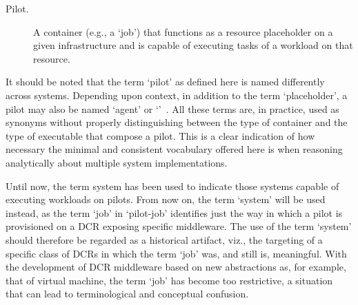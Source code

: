 \documentclass{sig-alternate}
\begin{document}

\begin{description}

\item[Pilot.] A container (e.g., a `job') that functions as a resource
placeholder on a given infrastructure and is capable of executing tasks of a
workload on that resource.

\end{description}

It should be noted that the term `pilot' as defined here is named differently
across \pilotjob systems. Depending upon context, in addition to the term
`placeholder', a pilot may also be named `agent' or
`\pilotjob'~\cite{moscicki2011,pinchak2002}. All these terms are, in practice,
used as synonyms without properly distinguishing between the type of container
and the type of executable that compose a pilot. This is a clear indication of
how necessary the minimal and consistent vocabulary offered here is when
reasoning analytically about multiple \pilotjob system implementations.

Until now, the term \pilotjob system has been used to indicate those systems
capable of executing workloads on pilots. From now on, the term `\pilot system'
will be used instead, as the term `job' in `pilot-job' identifies just the way
in which a pilot is provisioned on a DCR exposing specific middleware.
The use of the term `\pilotjob system' should therefore be regarded as a
historical artifact, viz., the targeting of a specific class of DCRs in which
the term `job' was, and still is, meaningful. With the development of DCR
middleware based on new abstractions as, for example, that of virtual machine,
the term `job' has become too restrictive, a situation that can lead to
terminological and conceptual confusion.
\end{document}
